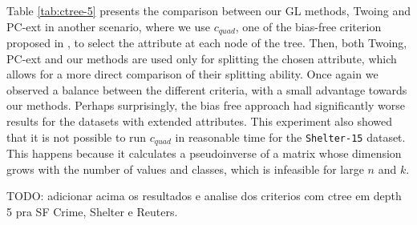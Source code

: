 Table \ref{tab:ctree-5} presents the 
comparison between our GL methods, Twoing and PC-ext in another scenario,
where we use $c_{quad}$, one of the bias-free criterion proposed in \cite{Hothorn:2006:URP}, to select the attribute at each node of the tree. 
Then, both Twoing, PC-ext and our methods are  used only for splitting the chosen attribute,  which allows for a  more direct comparison of their splitting ability. Once again we observed a balance between the different criteria, with a small advantage towards our methods. Perhaps surprisingly, the bias free approach had significantly worse results for the datasets with extended attributes. This experiment also showed that it is not possible to run $c_{quad}$ in reasonable time for the {\tt Shelter-15} dataset. This happens because it calculates a pseudoinverse of a matrix whose dimension grows with the number of values and classes, which is infeasible for large $n$ and $k$.

TODO: adicionar acima os resultados e analise dos criterios com ctree em depth 5 pra SF Crime, Shelter e Reuters.


